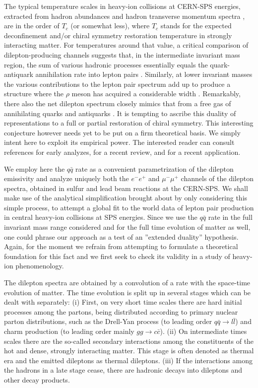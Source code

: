 The typical temperature scales in heavy-ion collisions
at CERN-SPS energies, extracted from hadron abundances 
\cite{abundances}
and hadron transverse momentum spectra \cite{J.Phys.,Heinz,Cassing}, 
are in the order of 
$T_c$ (or somewhat less), where
$T_c$ stands for the expected deconfinement and/or chiral symmetry
restoration temperature in strongly interacting matter.
For temperatures around that value, 
a critical comparison of dilepton-producing channels suggests that, 
in the intermediate invariant mass region, the sum of various hadronic
processes essentially equals the quark-antiquark annihilation rate into lepton
pairs \cite{LiGale}. 
Similarly, at lower invariant masses the various contributions to the
lepton pair spectrum add up to produce a structure where the $\rho$
meson has acquired a considerable width \cite{RappWambach}. Remarkably,
there also the net dilepton spectrum closely mimics that from a free
gas of annihilating quarks and antiquarks \cite{Klingl_Weise}. 
It is tempting to ascribe this duality of representations to 
a full or partial
restoration of chiral symmetry. This interesting conjecture however 
needs yet to be put on a firm theoretical basis. We simply intent here
to exploit its empirical power. The interested reader
can consult references \cite{Huang,Leonidov_Ruuskanen} for early
analyzes, \cite{RappWambach} for a recent review, and 
\cite{RappShuryak,Phys.Lett.,Schneider} for a recent application. 

We employ here the $q \bar q$ rate 
as a convenient parametrization of the dilepton emissivity
and analyze uniquely 
both the $e^- e^+$ and $\mu^- \mu^+$ channels of the dilepton spectra,
obtained in sulfur and lead beam reactions at the CERN-SPS.
We shall make use of the analytical simplification brought about by
only considering this simple process, to attempt a global fit to the
world data of lepton pair production in central
heavy-ion collisions at SPS 
energies. Since we use the $q \bar q$ rate 
in the full invariant mass range considered and
for the full time evolution of matter as well, 
one could phrase our approach as
a test of an  ''extended duality'' hypothesis. Again, for the moment we
refrain from attempting to formulate a theoretical foundation for this
fact and we first seek to check its validity in a study of heavy-ion
phenomenology.

The dilepton spectra are obtained by a convolution of a rate 
with the space-time evolution of matter. The time evolution is split up
in several stages which can be dealt with separately: 
(i) First, on very short time scales there are hard initial processes
among the partons, being distributed according to primary nuclear
parton distributions, such as the Drell-Yan process
(to leading order $ q \bar q \to l \bar l$)
and charm production
(to leading order mainly $gg \to c \bar c$).
(ii) On intermediate times scales there are the so-called secondary
interactions among the constituents of the hot and dense,
strongly interacting matter. This stage is often denoted as thermal era and
the emitted dileptons as thermal dileptons. 
(iii) If the interactions among the hadrons in a late stage cease, there
are hadronic decays into dileptons and other decay products.

